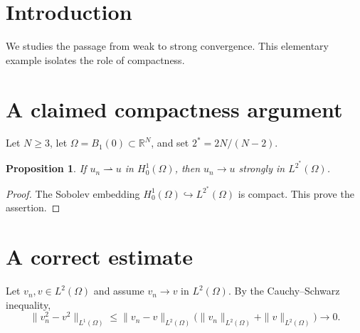 \documentclass{article}
\newcommand{\HH}{H_0^1(\Omega)}
\newtheorem{proposition}{Proposition}
\begin{document}
\section{Introduction}
\label{sec:introduction}
We studies the passage from weak to strong convergence.
This elementary example isolates the role of compactness.

\section{A claimed compactness argument}
Let $N\geq 3$, let $\Omega=B_1(0)\subset\mathbb R^N$, and set
$2^*=2N/(N-2)$.
\begin{proposition}\label{prop:critical}
If $u_n\rightharpoonup u$ in $\HH$, then
$u_n\to u$ strongly in $L^{2^*}(\Omega)$.
\end{proposition}
\begin{proof}
The Sobolev embedding $\HH\hookrightarrow L^{2^*}(\Omega)$ is compact.
This prove the assertion.
\end{proof}

\section{A correct estimate}
Let $v_n,v\in L^2(\Omega)$ and assume $v_n\to v$ in $L^2(\Omega)$.
By the Cauchy--Schwarz inequality,
\[
 \|v_n^2-v^2\|_{L^1(\Omega)}
 \leq \|v_n-v\|_{L^2(\Omega)}
       \bigl(\|v_n\|_{L^2(\Omega)}+\|v\|_{L^2(\Omega)}\bigr)\to0.
\]
\end{document}
